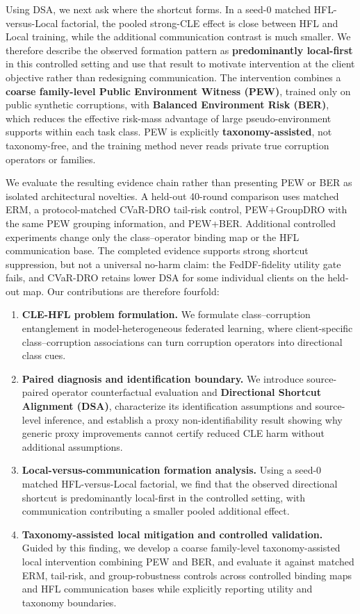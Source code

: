 \documentclass[10pt,twocolumn]{article}
\begin{document}
Using DSA, we next ask where the shortcut forms. In a seed-0 matched HFL-versus-Local factorial, the pooled strong-CLE effect is close between HFL and Local training, while the additional communication contrast is much smaller. We therefore describe the observed formation pattern as \textbf{predominantly local-first} in this controlled setting and use that result to motivate intervention at the client objective rather than redesigning communication. The intervention combines a \textbf{coarse family-level Public Environment Witness (PEW)}, trained only on public synthetic corruptions, with \textbf{Balanced Environment Risk (BER)}, which reduces the effective risk-mass advantage of large pseudo-environment supports within each task class. PEW is explicitly \textbf{taxonomy-assisted}, not taxonomy-free, and the training method never reads private true corruption operators or families.

We evaluate the resulting evidence chain rather than presenting PEW or BER as isolated architectural novelties. A held-out 40-round comparison uses matched ERM, a protocol-matched CVaR-DRO tail-risk control, PEW+GroupDRO with the same PEW grouping information, and PEW+BER. Additional controlled experiments change only the class--operator binding map or the HFL communication base. The completed evidence supports strong shortcut suppression, but not a universal no-harm claim: the FedDF-fidelity utility gate fails, and CVaR-DRO retains lower DSA for some individual clients on the held-out map. Our contributions are therefore fourfold:

\begin{enumerate}
\item \textbf{CLE-HFL problem formulation.} We formulate class--corruption entanglement in model-heterogeneous federated learning, where client-specific class--corruption associations can turn corruption operators into directional class cues.
\item \textbf{Paired diagnosis and identification boundary.} We introduce source-paired operator counterfactual evaluation and \textbf{Directional Shortcut Alignment (DSA)}, characterize its identification assumptions and source-level inference, and establish a proxy non-identifiability result showing why generic proxy improvements cannot certify reduced CLE harm without additional assumptions.
\item \textbf{Local-versus-communication formation analysis.} Using a seed-0 matched HFL-versus-Local factorial, we find that the observed directional shortcut is predominantly local-first in the controlled setting, with communication contributing a smaller pooled additional effect.
\item \textbf{Taxonomy-assisted local mitigation and controlled validation.} Guided by this finding, we develop a coarse family-level taxonomy-assisted local intervention combining PEW and BER, and evaluate it against matched ERM, tail-risk, and group-robustness controls across controlled binding maps and HFL communication bases while explicitly reporting utility and taxonomy boundaries.
\end{enumerate}
\end{document}
